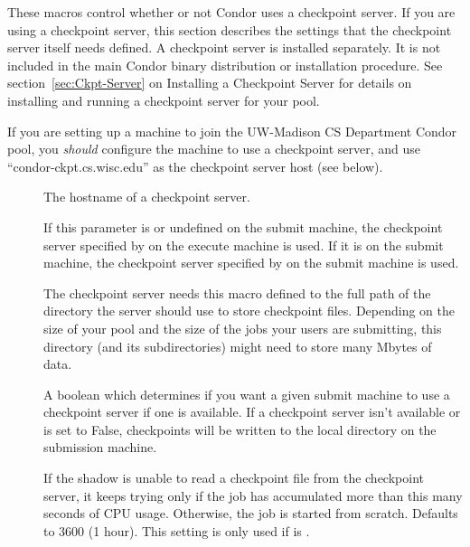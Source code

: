 These macros control whether or not Condor uses a checkpoint server.
If you are using a checkpoint server, this section
describes the settings that the checkpoint server itself needs
defined.  A checkpoint server is installed
separately. It is not included in the main Condor binary
distribution or installation procedure.  See
section~\ref{sec:Ckpt-Server} on Installing a Checkpoint Server
for details on installing and running a checkpoint server for your
pool.

\Note If you are setting up a machine to join the UW-Madison CS
Department Condor pool, you \emph{should} configure the machine to
use a checkpoint server, and use ``condor-ckpt.cs.wisc.edu'' as the
checkpoint server host (see below).

\begin{description}
  
\item[] \label{param:CkptServerHost} The
  hostname of a checkpoint server.

\item[]
  \label{param:StarterChoosesCkptServer} If this parameter is  
  or undefined on
  the submit machine, the checkpoint server specified by
   on the execute machine is used.  If it is
   on the submit machine, the checkpoint server
  specified by  on the submit machine is
  used.
  
\item[] \label{param:CkptServerDir} The
  checkpoint server needs this macro defined to the full path of the
  directory the server should use to store checkpoint files.
  Depending on the size of your pool and the size of the jobs your
  users are submitting, this directory (and its subdirectories) might
  need to store many Mbytes of data.

\item[] \label{param:UseCkptServer} A boolean
  which determines if you want a given submit machine to use a
  checkpoint server if one is available.  If a
  checkpoint server isn't available or  is set to
  False, checkpoints will be written to the local  directory on
  the submission machine.

\item[]
  \label{param:MaxDiscardedRunTime} If the shadow is unable to read a
  checkpoint file from the checkpoint server, it keeps trying only if
  the job has accumulated more than this many seconds of CPU usage.
  Otherwise, the job is started from scratch.  Defaults to 3600 (1
  hour). This setting is only used if  is
  .


\end{description}
